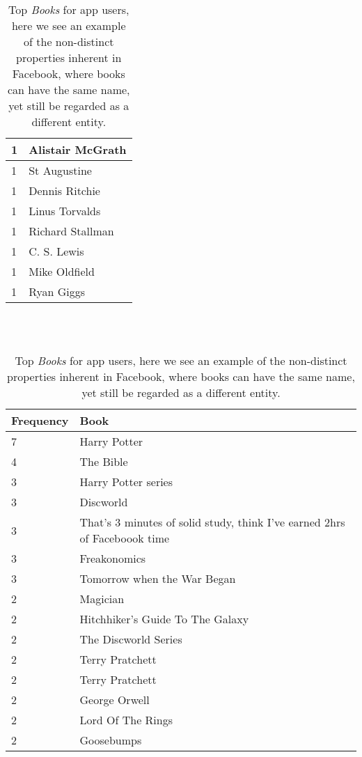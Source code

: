 \begin{table}[htb!]
\begin{minipage}[b]{.50\textwidth}
\begin{tabular}{|l|l|}
		1 & Alistair McGrath \\ \hline
		1 & St Augustine \\ \hline
		1 & Dennis Ritchie \\ \hline
		1 & Linus Torvalds \\ \hline
		1 & Richard Stallman \\ \hline
		1 & C. S. Lewis \\ \hline
		1 & Mike Oldfield \\ \hline
		1 & Ryan Giggs \\ \hline
  \end{tabular}
  \caption{Top \emph{Inspirational People} for app users}
\end{minipage}
\\
\\
\begin{minipage}[b]{1.0\textwidth}
\centering
  \begin{tabular}{|l|l|} %
  \hline
  	\textbf{Frequency} & \textbf{Book} \\ \hline
		7 & Harry Potter \\ \hline
		4 & The Bible \\ \hline
		3 & Harry Potter series \\ \hline
		3 & Discworld \\ \hline
		3 & That's 3 minutes of solid study, think I've earned 2hrs of Faceboook time \\ \hline
		3 & Freakonomics \\ \hline
		3 & Tomorrow when the War Began \\ \hline
		2 & Magician \\ \hline
		2 & Hitchhiker's Guide To The Galaxy \\ \hline
		2 & The Discworld Series \\ \hline
		2 & Terry Pratchett \\ \hline
		2 & Terry Pratchett \\ \hline
		2 & George Orwell \\ \hline
		2 & Lord Of The Rings \\ \hline
		2 & Goosebumps \\ \hline
  \end{tabular}
  \caption{Top \emph{Books} for app users, here we see an example of the non-distinct properties inherent in 
	Facebook, where books can have the same name, yet still be regarded as a different entity.}
\end{minipage}
\end{table}


